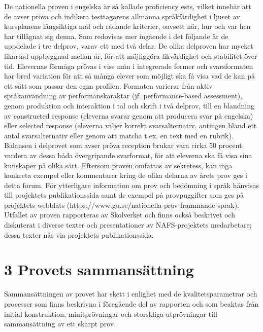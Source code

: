 De nationella proven i engelska är så kallade proficiency ests, vilket innebär att de avser pröva och indikera testtagarens allmänna språkfärdighet i ljuset av kursplanens långsiktiga mål och rådande kriterier, oavsett när, hur och var hen har tillägnat sig denna. Som redovisas mer ingående i det följande är de uppdelade i tre delprov, varav ett med två delar. De olika delproven har mycket likartad uppbyggnad mellan år, för att möjliggöra likvärdighet och stabilitet över tid.
Elevernas förmåga prövas i viss mån i integrerade former och svarsformaten har bred variation för att så många elever som möjligt ska få visa vad de kan på ett sätt som passar den egna profilen. Formaten varierar från aktiv språkanvändning av performanskaraktar (jf. performance-based assessment), genom produktion och interaktion i tal och skrift i två delprov, till en blandning av constructed response (eleverna svarar genom att producera svar på engelska) eller selected response (eleverna väljer korrekt svarsalternativ, antingen bland ett antal svarsalternativ eller genom att matcha t.ex. en text med en rubrik). Balansen i delprovet som avser pröva reception brukar vara cirka 50 procent vardera av dessa båda övergripande svarformat, för att eleverna ska få visa sina kunskaper på olika sätt.
Eftersom proven omfattas av sekretess, kan inga konkreta exempel eller kommentarer kring de olika delarna av årets prov ges i detta forum. För ytterligare information om prov och bedömning i språk hänvisas till projektets publikationssida samt de exempel på provpuggifter som ges på projektets webblats (https://www.gu.se/nationella-prov-frammande-sprak). Utfallet av proven rapporteras av Skolverket och finns också beskrivet och diskuterat i diverse texter och presentationer av NAFS-projektets medarbetare; dessa texter nås via projektets publikationssida.
\section*{3 Provets sammansättning}
Sammansättningen av provet har skett i enlighet med de kvalitetsparametrar och processer som finns beskrivna i föregående del av rapporten och som beaktas från initial konstruktion, minitprövningar och storskliga utprövningar till sammansättning av ett skarpt prov.
